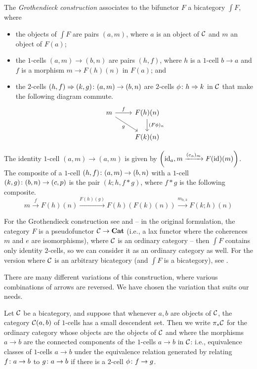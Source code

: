 \begin{definition}
  The \emph{Grothendieck construction} associates to the bifunctor $F$ a bicategory $\int F$, where
  \begin{itemize}
    \item the objects of $\int F$ are pairs $(a, m)$, where $a$ is an object of ${\mathcal{C}}$ and $m$ an object of $F(a)$;
    \item the $1$-cells $(a, m) \to (b, n)$ are pairs $(h, f)$, where $h$ is a $1$-cell $b \to a$ and $f$ is a morphism $m \to F(h)(n)$ in $F(a)$; and
    \item the $2$-cells $(h, f) \Rightarrow (k, g) \colon (a,m) \to (b,n)$ are $2$-cells $\phi\colon h \Rightarrow k$ in ${\mathcal{C}}$ that make the following diagram commute.
      \[
        \begin{tikzcd}
          m \arrow[r, "f"] \arrow[dr, "g"']
            & F(h)(n) \arrow[d, "(F\phi)_n"] \\
            & F(k)(n)
        \end{tikzcd}
        \]
  \end{itemize}
  The identity $1$-cell $(a,m)\to(a,m)$ is given by $\left(\operatorname{id}_a,m \xrightarrow{(e_a)_m} F(\operatorname{id})(m)\right)$.
  The composite of a $1$-cell $(h,f)\colon (a,m) \to (b,n)$ with a $1$-cell $(k,g)\colon (b,n) \to (c,p)$ is the pair $(k;h,f*g)$, where $f*g$ is the following composite.
  \[
    m \xrightarrow{f}
    F(h)(n) \xrightarrow{F(h)(g)}
    F(h)(F(k)(n)) \xrightarrow{m_{h,k}}
    F(k;h)(n)
    \]
\end{definition}
\begin{remark}
  For the Grothendieck construction see \cite[VI.8]{SGA1} and \cite[B1.3.1]{Elephant} -- in the original formulation, the category $F$ is a pseudofunctor ${\mathcal{C}} \to {\normalfont\textbf{Cat}}$ (i.e., a lax functor where the coherences $m$ and $e$ are isomorphisms), where ${\mathcal{C}}$ is an ordinary category -- then $\int F$ contains only identity $2$-cells, so we can consider it as an ordinary category as well.
  For the version where ${\mathcal{C}}$ is an arbitrary bicategory (and $\int F$ is a bicategory), see \cite{FibrationsInBicategories}.

  There are many different variations of this construction, where various combinations of arrows are reversed.  
  We have chosen the variation that suits our needs.
\end{remark}

\begin{definition}
  Let ${\mathcal{C}}$ be a bicategory, and suppose that whenever $a,b$ are objects of ${\mathcal{C}}$, the category ${\mathcal{C}}(a,b)$ of $1$-cells has a small descendent set.
  Then we write $\pi_*{\mathcal{C}}$ for the ordinary category whose objects are the objects of ${\mathcal{C}}$ and where the morphisms $a\to b$ are the connected components of the $1$-cells $a\to b$ in ${\mathcal{C}}$: i.e., equivalence classes of $1$-cells $a\to b$ under the equivalence relation generated by relating $f\colon a \to b$ to $g \colon a \to b$ if there is a $2$-cell $\phi \colon f \to g$.
\end{definition}

